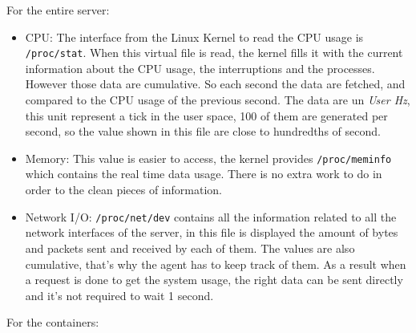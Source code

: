 For the entire server:

\begin{itemize}
\item{CPU: The interface from the Linux Kernel to read the CPU usage is
\texttt{/proc/stat}. When this virtual file is read, the kernel fills it with
the current information about the CPU usage, the interruptions and the
processes. However those data are cumulative. So each second the data are
fetched, and compared to the CPU usage of the previous second. The data are un
\textit{User Hz}, this unit represent a tick in the user space, 100 of them are
generated per second, so the value shown in this file are close to hundredths of
second.} \item{Memory: This value is easier to access, the kernel provides
\texttt{/proc/meminfo} which contains the real time data usage. There is no
extra work to do in order to the clean pieces of information.} \item{Network
I/O: \texttt{/proc/net/dev} contains all the information related to all the
network interfaces of the server, in this file is displayed the amount of bytes
and packets sent and received by each of them. The values are also cumulative,
that's why the agent has to keep track of them. As a result when a request is
done to get the system usage, the right data can be sent directly and it's not
required to wait 1 second.}
\end{itemize}

For the containers:


